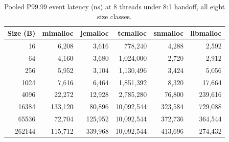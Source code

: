 \begin{table}[!htbp]
\centering
\footnotesize
\setlength{\tabcolsep}{3pt}
\caption{Pooled P99.99 event latency (ns) at 8 threads under 8:1 handoff, all eight size classes.}
\label{tab:atlas-p9999}
\begin{tabular}{rrrrrr}
\toprule
Size (B) & mimalloc & jemalloc & tcmalloc & snmalloc & libmalloc \\
\midrule
16 & 6{,}208 & 3{,}616 & 778{,}240 & 4{,}288 & 2{,}592 \\
64 & 4{,}160 & 3{,}680 & 1{,}024{,}000 & 2{,}720 & 2{,}912 \\
256 & 5{,}952 & 3{,}104 & 1{,}130{,}496 & 3{,}424 & 5{,}056 \\
1024 & 7{,}616 & 6{,}464 & 1{,}851{,}392 & 8{,}320 & 17{,}664 \\
4096 & 22{,}272 & 12{,}928 & 2{,}785{,}280 & 76{,}800 & 239{,}616 \\
16384 & 133{,}120 & 80{,}896 & 10{,}092{,}544 & 323{,}584 & 729{,}088 \\
65536 & 72{,}704 & 125{,}952 & 10{,}092{,}544 & 372{,}736 & 364{,}544 \\
262144 & 115{,}712 & 339{,}968 & 10{,}092{,}544 & 413{,}696 & 274{,}432 \\
\bottomrule
\end{tabular}
\end{table}
